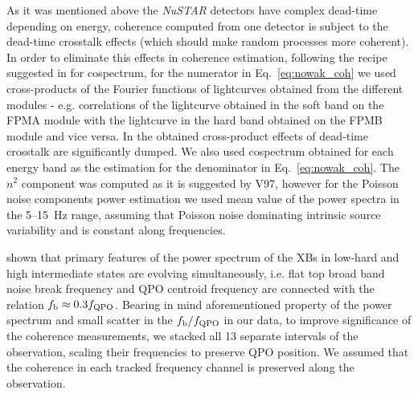 \documentclass[a4paper,fleqn,usenatbib]{mnras}
\begin{document}
As it was mentioned above the {\it NuSTAR} detectors have complex dead-time depending on energy, coherence computed from one detector is subject to the dead-time crosstalk effects (which should make random processes more coherent).
In order to eliminate this effects in coherence estimation, following the recipe suggested in \cite{2015ApJ...800..109B} for cospectrum, for the numerator in Eq.~\ref{eq:nowak_coh} we used cross-products of the Fourier functions of lightcurves obtained from the different modules - e.g. correlations of the lightcurve obtained in the soft band on the FPMA module with the lightcurve in the hard band obtained on the FPMB module and vice versa.
In the obtained cross-product effects of dead-time crosstalk are significantly dumped.
We also used cospectrum obtained for each energy band as the estimation for the denominator in Eq.~\ref{eq:nowak_coh}.
The $n^2$ component was computed as it is suggested by V97, however for the Poisson noise components power estimation we used mean value of the power spectra in the 5--15~Hz range, assuming that Poisson noise dominating intrinsic source variability and is constant along frequencies. 

\citet{wijnands99} shown that primary features of the power spectrum of the XBs in low-hard and high intermediate states are evolving simultaneously, i.e. flat top broad band noise break frequency and QPO centroid frequency are connected with the relation $f_{\rm b} \approx 0.3 f_{\rm QPO}$.
Bearing in mind aforementioned property of the power spectrum and small scatter in the $f_{\rm b}/f_{\rm QPO}$ in our data, to improve significance of the coherence measurements, we stacked all 13 separate intervals of the observation, scaling their frequencies to preserve QPO position. 
We assumed that the coherence in each tracked frequency channel is preserved along the observation. 
\end{document}
